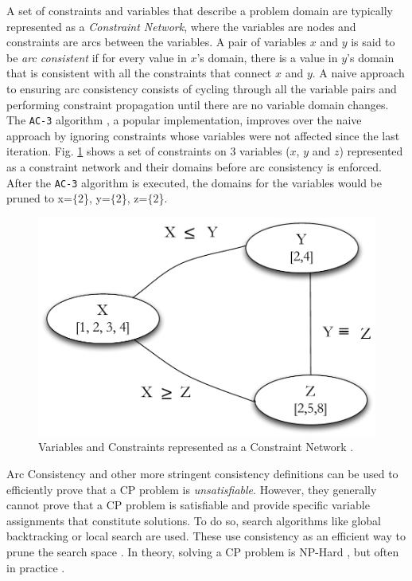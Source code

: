 {A set of constraints and variables that describe a problem domain are
typically represented as a \emph{Constraint Network}, where the
variables are nodes and constraints are arcs between the variables. A
pair of variables $x$ and $y$ is said to be \emph{arc consistent} if
for every value in $x$'s domain, there is a value in $y$'s domain that
is consistent with all the constraints that connect $x$ and $y$.  A
naive approach to ensuring arc consistency consists of cycling through
all the variable pairs and performing constraint propagation until
there are no variable domain changes. The \texttt{AC-3} algorithm
\cite{mackworth77}, a popular implementation, improves over the naive
approach by ignoring constraints whose variables were not affected
since the last iteration. Fig. \ref{fig:constraintnet} shows a set of
constraints on $3$ variables ($x$, $y$ and $z$) represented as a
constraint network and their domains before arc consistency is
enforced.  After the \texttt{AC-3} algorithm is executed, the domains
for the variables would be pruned to x=$\{2$\}, y=$\{2$\}, z=$\{2$\}.

\begin{figure}[!t]
\centering
\includegraphics[scale=0.3]{figs/constraint-net.pdf}
\caption{\small Variables and Constraints represented as a Constraint
  Network .}
\label{fig:constraintnet}
\end{figure}

Arc Consistency and other more stringent consistency definitions can
be used to efficiently prove that a \textsf{CP} problem is
\emph{unsatisfiable}. However, they generally cannot prove that a
\textsf{CP} problem is satisfiable and provide specific variable
assignments that constitute solutions. To do so, search algorithms
like global backtracking \cite{hooker05} or local search are used.
These use consistency as an efficient way to prune the search space
\cite{cp06}. In theory, solving a \textsf{CP} problem is NP-Hard
\cite{ghallab04}, but often in practice .

}
